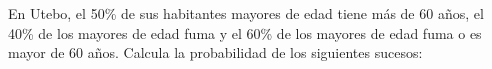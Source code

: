 \documentclass[addpoints,spanish, 12pt,a4paper]{exam}
\begin{document}
\begin{questions}
\addpoints

        \question[1] En Utebo, el 50\% de sus habitantes mayores de edad tiene más de 60 años, el 40\% de los mayores de edad fuma y el 60\% de los mayores de edad
fuma o es mayor de 60 años. 
Calcula la probabilidad de los siguientes sucesos:
        
        
        


\end{questions}
\end{document}
